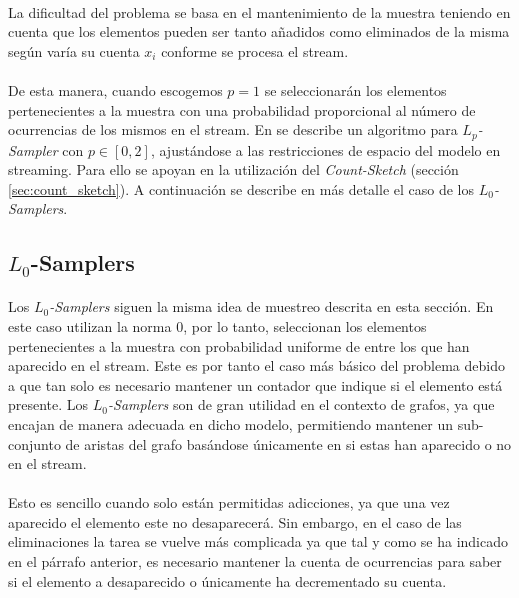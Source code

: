 \documentclass{subfiles}
\begin{document}
      \paragraph{}
      La dificultad del problema se basa en el mantenimiento de la muestra teniendo en cuenta que los elementos pueden ser tanto añadidos como eliminados de la misma según varía su cuenta $x_i$ conforme se procesa el stream.

      \paragraph{}
      De esta manera, cuando escogemos $p =1$ se seleccionarán los elementos pertenecientes a la muestra con una probabilidad proporcional al número de ocurrencias de los mismos en el stream. En \cite{jowhari2011tight} se describe un algoritmo para \emph{$L_p$-Sampler} con $p \in [0,2]$, ajustándose a las restricciones de espacio del modelo en streaming. Para ello se apoyan en la utilización del \emph{Count-Sketch} (sección \ref{sec:count_sketch}). A continuación se describe en más detalle el caso de los \emph{$L_0$-Samplers}.

      \subsection{$L_0$-Samplers}
      \label{sec:l0_samplers}

      \paragraph{}
      Los \emph{$L_0$-Samplers} siguen la misma idea de muestreo descrita en esta sección. En este caso utilizan la norma $0$, por lo tanto, seleccionan los elementos pertenecientes a la muestra con probabilidad uniforme de entre los que han aparecido en el stream. Este es por tanto el caso más básico del problema debido a que tan solo es necesario mantener un contador que indique si el elemento está presente. Los \emph{$L_0$-Samplers} son de gran utilidad en el contexto de grafos, ya que encajan de manera adecuada en dicho modelo, permitiendo mantener un sub-conjunto de aristas del grafo basándose únicamente en si estas han aparecido o no en el stream.

      \paragraph{}
      Esto es sencillo cuando solo están permitidas adicciones, ya que una vez aparecido el elemento este no desaparecerá. Sin embargo, en el caso de las eliminaciones la tarea se vuelve más complicada ya que tal y como se ha indicado en el párrafo anterior, es necesario mantener la cuenta de ocurrencias para saber si el elemento a desaparecido o únicamente ha decrementado su cuenta.
\end{document}
